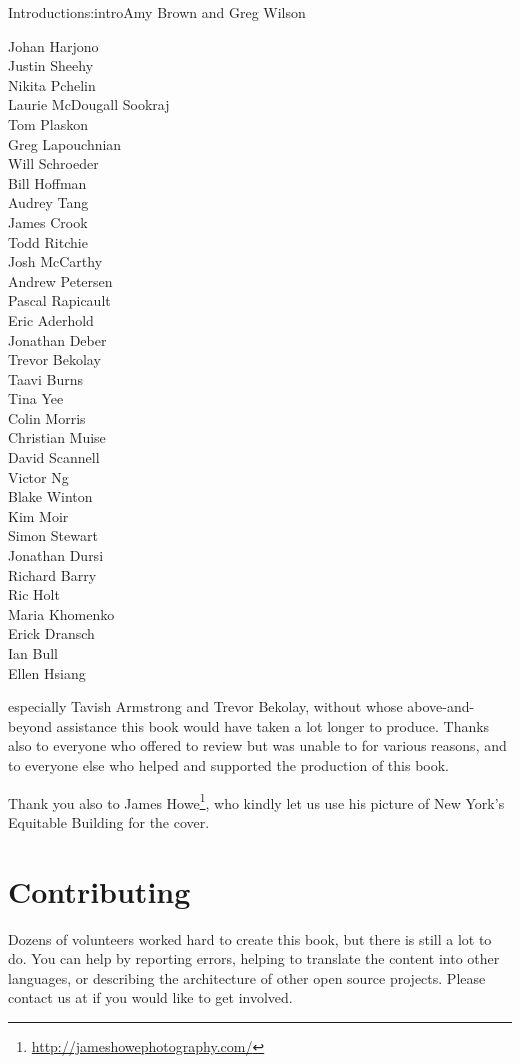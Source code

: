 \begin{aosachapter}{Introduction}{s:intro}{Amy Brown and Greg Wilson}
\begin{multicols}{3}
\noindent Johan Harjono \\
Justin Sheehy \\
Nikita Pchelin \\
Laurie McDougall Sookraj \\
Tom Plaskon \\
Greg Lapouchnian \\
Will Schroeder \\
Bill Hoffman \\
Audrey Tang \\
James Crook \\
Todd Ritchie \\
Josh McCarthy \\
Andrew Petersen \\
Pascal Rapicault \\
Eric Aderhold \\
Jonathan Deber \\
Trevor Bekolay \\
Taavi Burns \\
Tina Yee \\
Colin Morris \\
Christian Muise \\
David Scannell \\
Victor Ng \\
Blake Winton \\
Kim Moir \\
Simon Stewart \\
Jonathan Dursi \\
Richard Barry \\
Ric Holt \\
Maria Khomenko \\
Erick Dransch \\
Ian Bull \\
Ellen Hsiang
\end{multicols}

\noindent
especially Tavish Armstrong and Trevor Bekolay, without whose
above-and-beyond assistance this book would have taken a lot longer to produce.
Thanks also to everyone who offered to review but was unable to for various
reasons, and to everyone else who helped and supported the production of this
book.

Thank you also to James Howe\footnote{\url{http://jameshowephotography.com/}}, who
kindly let us use his picture of New York's Equitable Building for the cover.

\section*{Contributing}

Dozens of volunteers worked hard to create this book, but there is
still a lot to do.  You can help by reporting errors, helping to
translate the content into other languages, or describing the
architecture of other open source projects.  Please contact us at
 if you would like to get involved.

\end{aosachapter}
